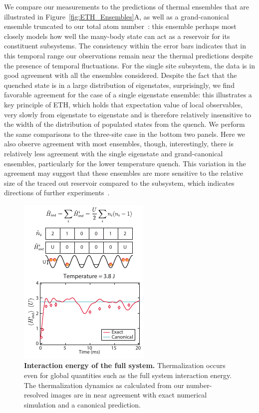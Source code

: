 We compare our measurements to the predictions of thermal ensembles that are illustrated in Figure~\ref{fig:ETH_Ensembles}A, as well as a grand-canonical ensemble truncated to our total atom number~\cite{AppendixA}: this ensemble perhaps most closely models how well the many-body state can act as a reservoir for its constituent subsystems. The consistency within the error bars indicates that in this temporal range our observations remain near the thermal predictions despite the presence of temporal fluctuations. For the single site subsystem, the data is in good agreement with all the ensembles considered. Despite the fact that the quenched state is in a large distribution of eigenstates, surprisingly, we find favorable agreement for the case of a single eigenstate ensemble: this illustrates a key principle of ETH, which holds that expectation value of local observables, very slowly from eigenstate to eigenstate and is therefore relatively insensitive to the width of the distribution of populated states from the quench. We perform the same comparisons to the three-site case in the bottom two panels. Here we also observe agreement with most ensembles, though, interestingly, there is relatively less agreement with the single eigenstate and grand-canonical ensembles, particularly for the lower temperature quench. This variation in the agreement may suggest that these ensembles are more sensitive to the relative size of the traced out reservoir compared to the subsystem, which indicates directions of further experiments~\cite{Rigol2012}.

\begin{figure}[t!]
	\centering
	\includegraphics[scale=1.75]{figures/ETH_Eint.pdf}
	\caption{{\bf Interaction energy of the full system. } Thermalization occurs even for global quantities such as the full system interaction energy. The thermalization dynamics as calculated from our number-resolved images are in near agreement with exact numerical simulation and a canonical prediction.}
	\label{fig:ETH}
\end{figure}

